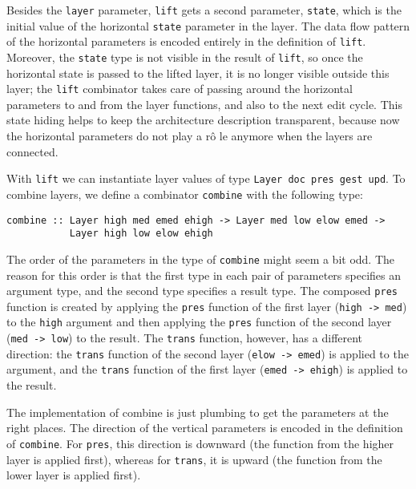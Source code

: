 Besides the \texttt{layer} parameter, \texttt{lift} gets a second parameter, \texttt{state}, which is the initial value of the horizontal \texttt{state} parameter in the layer. The data flow pattern of the horizontal parameters is encoded entirely in the definition of \texttt{lift}. Moreover, the \texttt{state} type is not visible in the result of \texttt{lift}, so once the horizontal state is passed to the lifted layer, it is no longer visible outside this layer; the \texttt{lift} combinator takes care of passing around the horizontal parameters to and from the layer functions, and also to the next edit cycle. This state hiding helps to keep the architecture description transparent, because now the horizontal parameters do not play a r\^o le anymore when the layers are connected.


With \texttt{lift} we can instantiate layer values of type \texttt{Layer doc pres gest upd}. To combine layers, we define a combinator \texttt{combine} with the following type:

\begin{small}
\begin{verbatim}
combine :: Layer high med emed ehigh -> Layer med low elow emed -> 
           Layer high low elow ehigh
\end{verbatim}
\end{small}

The order of the parameters in the type of \texttt{combine} might seem a bit odd. The reason for this order is that the first type in each pair of parameters specifies an argument type, and the second type specifies a result type. The composed \texttt{pres} function is created by applying the \texttt{pres} function of the first layer (\texttt{high -> med}) to the \texttt{high} argument and then applying the \texttt{pres} function of the second layer (\texttt{med -> low}) to the result. The \texttt{trans} function, however, has a different direction: the \texttt{trans} function of the second layer (\texttt{elow -> emed}) is applied to the argument, and the \texttt{trans} function of the first layer (\texttt{emed -> ehigh}) is applied to the result.

The implementation of combine is just plumbing to get the parameters at the right places. The direction of the vertical parameters is encoded in the definition of \texttt{combine}. For \texttt{pres}, this direction is downward (the function from the higher layer is applied first), whereas for \texttt{trans}, it is upward (the function from the lower layer is applied first).

